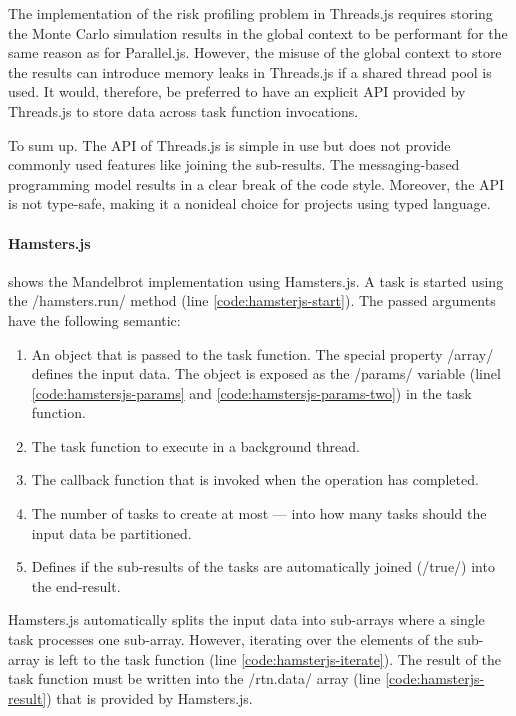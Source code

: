 The implementation of the risk profiling problem in Threads.js requires storing the Monte Carlo simulation results in the global context to be performant for the same reason as for Parallel.js. However, the misuse of the global context to store the results can introduce memory leaks in Threads.js if a shared thread pool is used. It would, therefore, be preferred to have an explicit API provided by Threads.js to store data across task function invocations.

To sum up. The API of Threads.js is simple in use but does not provide commonly used features like joining the sub-results. The messaging-based programming model results in a clear break of the code style. Moreover, the API is not type-safe, making it a nonideal choice for projects using typed language.

\paragraph{Hamsters.js}
 shows the Mandelbrot implementation using Hamsters.js. A task is started using the \javascriptinline/hamsters.run/ method (line \ref{code:hamsterjs-start}). The passed arguments have the following semantic:

\begin{enumerate}
	\item An object that is passed to the task function. The special property \javascriptinline/array/ defines the input data. The object is exposed as the \javascriptinline/params/ variable (linel \ref{code:hamstersjs-params} and \ref{code:hamstersjs-params-two}) in the task function.
	\item The task function to execute in a background thread.
	\item The callback function that is invoked when the operation has completed.
	\item The number of tasks to create at most --- into how many tasks should the input data be partitioned. 
	\item Defines if the sub-results of the tasks are automatically joined (\javascriptinline/true/) into the end-result.
\end{enumerate}

Hamsters.js automatically splits the input data into sub-arrays where a single task processes one sub-array. However, iterating over the elements of the sub-array is left to the task function (line \ref{code:hamsterjs-iterate}). The result of the task function must be written into the \javascriptinline/rtn.data/ array (line \ref{code:hamsterjs-result}) that is provided by Hamsters.js. 

